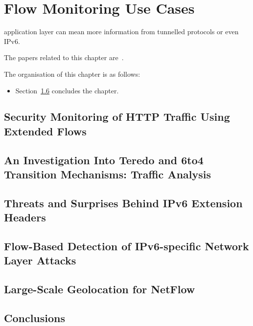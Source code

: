 \chapter{Flow Monitoring Use Cases}

\begin{chapintro}

application layer can mean more information from tunnelled protocols or even IPv6.

The papers related to this chapter are~\cite{Husak-2015-Security, Elich-2013-Investigation, Celeda-2013-Large, Hendriks-2017-Flow, Hendriks-2017-Threats}.

The organisation of this chapter is as follows:
\begin{itemize}
  \item Section~\ref{sec:use-cases-conclusions} concludes the chapter.
\end{itemize}

\end{chapintro}

\newpage

\section{Security Monitoring of HTTP Traffic Using Extended Flows}

\section{An Investigation Into Teredo and 6to4 Transition Mechanisms: Traffic Analysis}

\section{Threats and Surprises Behind IPv6 Extension Headers}

\section{Flow-Based Detection of IPv6-specific Network Layer Attacks}

\section{Large-Scale Geolocation for NetFlow}

\section{Conclusions}\label{sec:use-cases-conclusions}